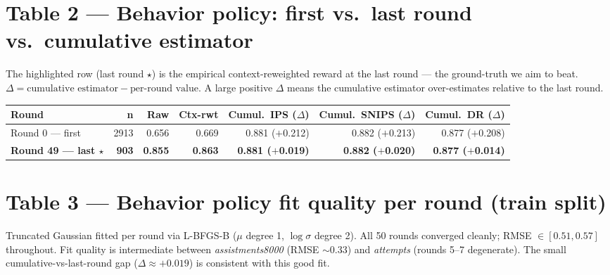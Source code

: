 \documentclass[11pt]{article}
\begin{document}
\section*{Table 2 — Behavior policy: first vs.\ last round vs.\ cumulative estimator}

{\small The highlighted row (last round $\star$) is the empirical context-reweighted reward at the
last round --- the ground-truth we aim to beat.
$\Delta = \text{cumulative estimator} - \text{per-round value}$.
A large positive $\Delta$ means the cumulative estimator over-estimates relative to the last round.}

\bigskip
\begin{tabular}{lrrrrrr}
\toprule
\textbf{Round} & \textbf{n} & \textbf{Raw} & \textbf{Ctx-rwt} & \textbf{Cumul.\ IPS ($\Delta$)} & \textbf{Cumul.\ SNIPS ($\Delta$)} & \textbf{Cumul.\ DR ($\Delta$)} \\
\midrule
Round 0 --- first & 2913 & 0.656 & 0.669 & 0.881 ($+$0.212) & 0.882 ($+$0.213) & 0.877 ($+$0.208) \\
\rowcolor{groundbg}
\textbf{Round 49 --- last $\star$} & \textbf{903} & \textbf{0.855} & \textbf{0.863} & \textbf{0.881 ($+$0.019)} & \textbf{0.882 ($+$0.020)} & \textbf{0.877 ($+$0.014)} \\
\bottomrule
\end{tabular}

\section*{Table 3 — Behavior policy fit quality per round (train split)}

{\small Truncated Gaussian fitted per round via L-BFGS-B ($\mu$ degree 1, $\log\sigma$ degree 2).
All 50 rounds converged cleanly; RMSE $\in [0.51, 0.57]$ throughout.
Fit quality is intermediate between \textit{assistments8000} (RMSE $\sim 0.33$) and
\textit{attempts} (rounds 5--7 degenerate). The small cumulative-vs-last-round gap
($\Delta \approx +0.019$) is consistent with this good fit.}
\end{document}
